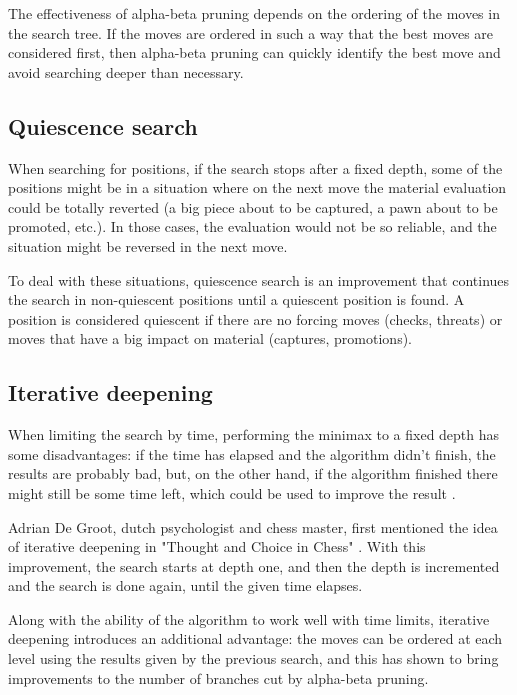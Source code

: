 The effectiveness of alpha-beta pruning depends on the ordering of the moves in the search tree. If the moves are ordered in such a way that the best moves are considered first, then alpha-beta pruning can quickly identify the best move and avoid searching deeper than necessary.

\subsection{Quiescence search}
\label{subsec:ch2sec2subsec3}

When searching for positions, if the search stops after a fixed depth, some of the positions might be in a situation where on the next move the material evaluation could be totally reverted (a big piece about to be captured, a pawn about to be promoted, etc.). In those cases, the evaluation would not be so reliable, and the situation might be reversed in the next move.

To deal with these situations, quiescence search is an improvement that continues the search in non-quiescent positions until a quiescent position is found. A position is considered quiescent if there are no forcing moves (checks, threats) or moves that have a big impact on material (captures, promotions).


\subsection{Iterative deepening}
\label{subsec:ch2sec1subsec4}

When limiting the search by time, performing the minimax to a fixed depth has some disadvantages: if the time has elapsed and the algorithm didn't finish, the results are probably bad, but, on the other hand, if the algorithm finished there might still be some time left, which could be used to improve the result \cite{carolus2006alpha}.

Adrian De Groot, dutch psychologist and chess master, first mentioned the idea of iterative deepening in "Thought and Choice in Chess" \cite{thought2014groot}. With this improvement, the search starts at depth one, and then the depth is incremented and the search is done again, until the given time elapses.

Along with the ability of the algorithm to work well with time limits, iterative deepening introduces an additional advantage: the moves can be ordered at each level using the results given by the previous search, and this has shown to bring improvements to the number of branches cut by alpha-beta pruning.

